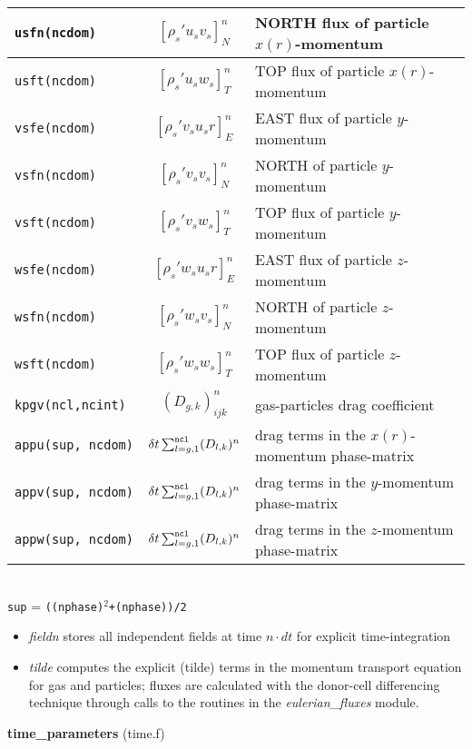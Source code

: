 \begin{tabular}{|p{4cm}|c|p{8cm}|}
\tt usfn(ncdom) & $\left[ \rho_s' u_s v_s \right]_{N}^n$ & NORTH flux of particle $x(r)$-momentum \\\hline
\tt usft(ncdom) & $\left[ \rho_s' u_s w_s \right]_{T}^n$ & TOP flux of particle $x(r)$-momentum \\\hline
\tt vsfe(ncdom) & $\left[ \rho_s' v_s u_s r \right]_{E}^n$ & EAST flux of particle $y$-momentum \\\hline
\tt vsfn(ncdom) & $\left[ \rho_s' v_s v_s \right]_{N}^n$ & NORTH of particle $y$-momentum \\\hline
\tt vsft(ncdom) & $\left[ \rho_s' v_s w_s \right]_{T}^n$ & TOP flux of particle $y$-momentum \\\hline
\tt wsfe(ncdom) & $\left[ \rho_s' w_s u_s r \right]_{E}^n$ & EAST flux of particle $z$-momentum \\\hline
\tt wsfn(ncdom) & $\left[ \rho_s' w_s v_s \right]_{N}^n$ & NORTH of particle $z$-momentum \\\hline
\tt wsft(ncdom) & $\left[ \rho_s' w_s w_s \right]_{T}^n$ & TOP flux of particle $z$-momentum \\\hline

\tt kpgv(ncl,ncint) & $(D_{g,k})^n_{ijk}$ & gas-particles drag coefficient\\\hline
\tt appu(sup, ncdom) & $\delta t\sum_{l=g,1}^{\tt ncl}(D_{l,k})^n$ & drag terms in the $x(r)$-momentum phase-matrix\\\hline
\tt appv(sup, ncdom) &  $\delta t\sum_{l=g,1}^{\tt ncl}(D_{l,k})^n$ & drag terms in the $y$-momentum phase-matrix\\\hline
\tt appw(sup, ncdom) &  $\delta t\sum_{l=g,1}^{\tt ncl}(D_{l,k})^n$ & drag terms in the $z$-momentum phase-matrix\\\hline
\end{tabular}\\
{\tt sup} = {\tt ((nphase)$^2$+(nphase))/2}
\begin{itemize}
\item{\em fieldn} stores all independent fields at time $n\cdot dt$ for explicit time-integration
\item{\em tilde} computes the explicit (tilde) terms in the momentum transport equation for gas and particles; fluxes are calculated with the donor-cell differencing technique through calls to the routines in the {\em eulerian\_fluxes} module.
\end{itemize}
%
%
{\large{\bf time\_parameters}} (time.f)\\[5mm]

